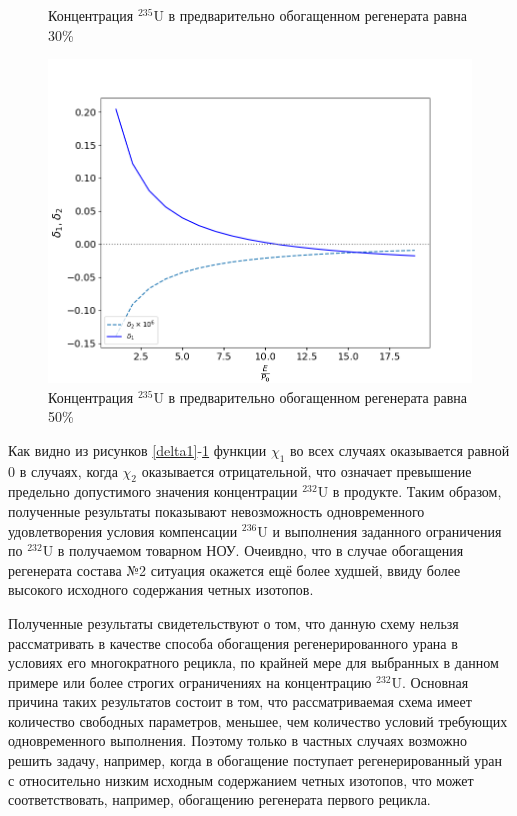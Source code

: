 \begin{figure}[ht]
\begin{minipage}{.5\textwidth}
    \caption{Концентрация $^{235}$U в предварительно обогащенном регенерата равна 30\%}
    \label{delta3}
  \end{minipage}
  \begin{minipage}{.5\textwidth}
    \centering
    \includegraphics[width=.8\linewidth]{images/plots/50}  
    \caption{Концентрация $^{235}$U в предварительно обогащенном регенерата равна 50\%}
    \label{delta4}
  \end{minipage}
 \end{figure}

Как видно из рисунков \ref{delta1}-\ref{delta4} функции $\chi_1$ во всех случаях оказывается равной 0 в случаях, когда $\chi_2$ оказывается отрицательной, что означает превышение предельно допустимого значения концентрации $^{232}$U в продукте. Таким образом, полученные результаты показывают невозможность одновременного удовлетворения условия компенсации $^{236}$U и выполнения заданного ограничения по $^{232}$U в получаемом товарном НОУ. Очеивдно, что в случае обогащения регенерата состава №2 ситуация окажется ещё более худшей, ввиду более высокого исходного содержания четных изотопов. 

Полученные результаты свидетельствуют о том, что данную схему нельзя рассматривать в качестве способа обогащения регенерированного урана в условиях его многократного рецикла, по крайней мере для выбранных в данном примере или более строгих ограничениях на концентрацию $^{232}$U. Основная причина таких результатов состоит в том, что рассматриваемая схема имеет количество свободных параметров, меньшее, чем количество условий требующих одновременного выполнения. Поэтому только в частных случаях возможно решить задачу, например, когда в обогащение поступает регенерированный уран с относительно низким исходным содержанием четных изотопов, что может соответствовать, например, обогащению регенерата первого рецикла.



